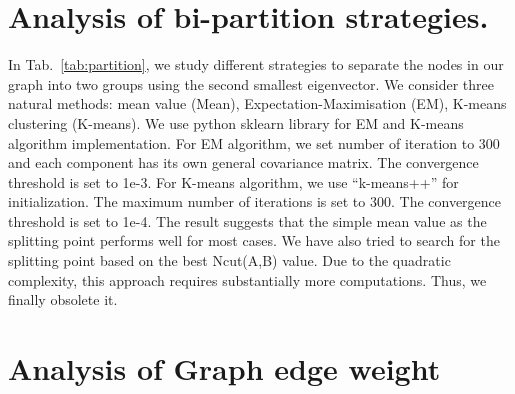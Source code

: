 \documentclass[twocolumn]{article}
\begin{document}
\section{Analysis of bi-partition strategies.}

In Tab.~\ref{tab:partition}, we study different strategies to separate the nodes in our graph into two groups using the second smallest eigenvector. We consider three natural methods: mean value (Mean), Expectation-Maximisation (EM), K-means clustering (K-means). We use python sklearn library for EM and K-means algorithm implementation. For EM algorithm, we set number of iteration to 300 and each component has its own general covariance matrix. The convergence threshold is set to 1e-3. For K-means algorithm, we use ``k-means++'' for initialization. The maximum number of iterations is set to 300. The convergence threshold is set to 1e-4. The result suggests that the simple mean value as the splitting point performs well for most cases. We have also tried to search for the splitting point based on the best Ncut(A,B) value. Due to the quadratic complexity, this approach requires substantially more computations. Thus,  we finally obsolete it. 

\begin{table}[!ht]
	\begin{center}
	\caption{\textbf{Analysis of different bi-partition methods.} We report CorLoc for unsupervised single object discovery.}   
	\label{tab:partition}
	\end{center}

\end{table} 










\section{Analysis of Graph edge weight}
\label{sec:backbone}
\end{document}

